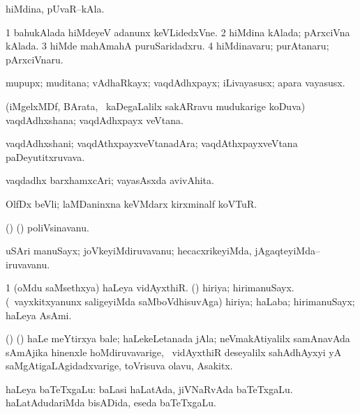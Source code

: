 \bentry
{}
\gl{\nA}
\bmng
hiMdina, pUvaR--kAla. 
\emng

\noindent
\gl{\pagu}
\bmng
\bnum
\num{1}  bahukAlada hiMdeyeV adanunx keVLidedxVne. 
\num{2}  hiMdina kAlada; pArxciVna kAlada. 
\num{3}  hiMde mahAmahA puruSaridadxru. 
\num{4}  hiMdinavaru; purAtanaru; pArxciVnaru. 
\enum
\emng
\eentry

\bentry
{}
\gl{\nA}
\bmng
mupupx; muditana; vAdhaRkayx; vaqdAdhxpayx; iLivayasusx; apara vayasusx. 
\emng
\eentry

\bentry
{}
\gl{\nA}
\bmng
(iMgelxMDf, BArata, \mo\ kaDegaLalilx sakARravu mudukarige koDuva) vaqdAdhxshana; vaqdAdhxpayx veVtana. 
\emng
\eentry

\bentry
{}
\gl{\nA}
\bmng
vaqdAdhxshani; vaqdAthxpayxveVtanadAra; vaqdAthxpayxveVtana paDeyutitxruvava. 
\emng
\eentry

\bentry
{}
\gl{\nA}
\bmng
vaqdadhx barxhamxcAri; vayasAsxda avivAhita. 
\emng
\eentry

\bentry
{}
\gl{\nA}
\bmng
OlfDx beVli; laMDaninxna keVMdarx kirxminalf koVTuR. 
\emng
\eentry

\bentry
{}
\gl{\nA}
\bmng
(\birx) (\ashi) poliVsinavanu. 
\emng
\eentry

\bentry
{}
\gl{\nA}
\bmng
uSAri manuSayx; joVkeyiMdiruvavanu; hecacxrikeyiMda, jAgaqteyiMda--iruvavanu. 
\emng
\eentry

\bentry
{}
\gl{\nA}
\bmng
\bnum
\num{1} (oMdu saMsethxya) haLeya vidAyxthiR. 
\banum
{} (\AmA) hiriya; hirimanuSayx. 
 (\kanmu\ vayxkitxyanunx saligeyiMda saMboVdhisuvAga) hiriya; haLaba; hirimanuSayx; haLeya AsAmi. 
\eanum
\numie
\enum
\emng
\eentry

\bentry
{}
\gl{\nA}
\bmng
(\birx) (\AmA) haLe meYtirxya bale; haLekeLetanada jAla; neVmakAtiyalilx samAnavAda sAmAjika hinenxle hoMdiruvavarige, \kanmu\ vidAyxthiR deseyalilx sahAdhAyxyi yA saMgAtigaLAgidadxvarige, toVrisuva olavu, Asakitx. 
\emng
\eentry

\bentry
{}
\gl{\nA}
\bmng
haLeya baTeTxgaLu: 
\banum
{} baLasi haLatAda, jiVNaRvAda baTeTxgaLu. 
 haLatAdudariMda bisADida, eseda baTeTxgaLu. 
\eanum
\emng
\eentry

